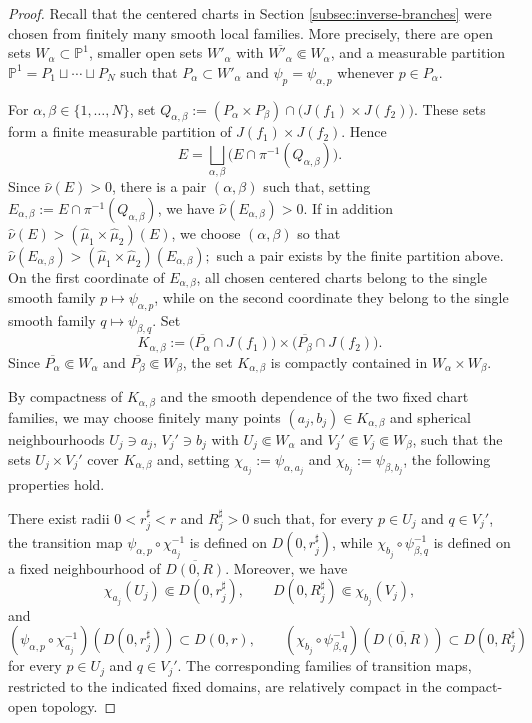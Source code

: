 \documentclass[11pt]{amsart}
\numberwithin{equation}{section}
\theoremstyle{plain}
\theoremstyle{definition}
\theoremstyle{remark}
\begin{document}
\begin{proof}
Recall that the centered charts in Section
\ref{subsec:inverse-branches} were chosen from finitely many smooth local
families. More precisely, there are open sets
$W_\alpha\subset\mathbb P^1$, smaller open sets
$W'_\alpha$ with
$\overline{W'_\alpha}\Subset W_\alpha$, and a measurable partition
$
\mathbb P^1=P_1\sqcup\cdots\sqcup P_N
$
such that $P_\alpha\subset W'_\alpha$ and
$\psi_p=\psi_{\alpha,p}$ whenever $p\in P_\alpha$.

For $\alpha,\beta\in\{1,\ldots,N\}$, set
$Q_{\alpha,\beta}
:=
(P_\alpha\times P_\beta)
\cap
\bigl(J(f_1)\times J(f_2)\bigr)$.
These sets form a finite measurable partition of
$J(f_1)\times J(f_2)$. Hence
$$
E
=
\bigsqcup_{\alpha,\beta}
\bigl(E\cap\pi^{-1}(Q_{\alpha,\beta})\bigr).
$$
Since $\hat\nu(E)>0$, there is a pair $(\alpha,\beta)$ such that, setting
$
E_{\alpha,\beta}:=
E\cap\pi^{-1}(Q_{\alpha,\beta})$,
we have $\hat\nu(E_{\alpha,\beta})>0$.
If in addition
$\hat\nu(E)>
(\hat\mu_1\times\hat\mu_2)(E)$,
we choose $(\alpha,\beta)$ so that
$
\hat\nu(E_{\alpha,\beta})>
(\hat\mu_1\times\hat\mu_2)(E_{\alpha,\beta});
$
such a pair exists by the finite partition above.
On the first coordinate of $E_{\alpha,\beta}$, all chosen centered
charts belong to the single smooth family
$p\mapsto\psi_{\alpha,p}$, while on the second coordinate they belong
to the single smooth family
$q\mapsto\psi_{\beta,q}$.
Set
$$
K_{\alpha,\beta}
:=
\bigl(\overline{P_\alpha}\cap J(f_1)\bigr)
\times
\bigl(\overline{P_\beta}\cap J(f_2)\bigr).
$$
Since
$\overline{P_\alpha}\Subset W_\alpha$ and
$\overline{P_\beta}\Subset W_\beta$, the set
$K_{\alpha,\beta}$ is compactly contained in
$W_\alpha\times W_\beta$.

By compactness of $K_{\alpha,\beta}$ and the smooth dependence
of the two fixed chart families, we may choose finitely many points
$(a_j,b_j)\in K_{\alpha,\beta}$ and spherical neighbourhoods
$U_j\ni a_j$, $V_j'\ni b_j$ 
with $U_j\Subset W_\alpha$ and 
$V_j'\Subset V_j\Subset W_\beta$,
such that the sets $U_j\times V_j'$ cover $K_{\alpha,\beta}$ and,
setting
$\chi_{a_j}:=\psi_{\alpha,a_j}$ and 
$\chi_{b_j}:=\psi_{\beta,b_j}$,
the following properties hold.

\smallskip

There exist radii $0<r_j^\sharp<r$ and $R_j^\sharp>0$ such that,
for every $p\in U_j$ and $q\in V_j'$, the transition map
$\psi_{\alpha,p}\circ\chi_{a_j}^{-1}$ is defined on
$D(0,r_j^\sharp)$, while
$\chi_{b_j}\circ\psi_{\beta,q}^{-1}$ is defined on a fixed
neighbourhood of $\overline{D(0,R)}$. Moreover, we have
$$
\chi_{a_j}(U_j)\Subset D(0,r_j^\sharp),
\qquad
D(0,R_j^\sharp)\Subset\chi_{b_j}(V_j),
$$
and
$$
(\psi_{\alpha,p}\circ\chi_{a_j}^{-1})(D(0,r_j^\sharp))
\subset D(0,r),
\qquad
(\chi_{b_j}\circ\psi_{\beta,q}^{-1})(\overline{D(0,R)})
\subset D(0,R_j^\sharp)
$$
for every $p\in U_j$ and $q\in V_j'$. The corresponding families
of transition maps, restricted to the indicated fixed domains, are
relatively compact in the compact-open topology.


\end{proof}
\end{document}

